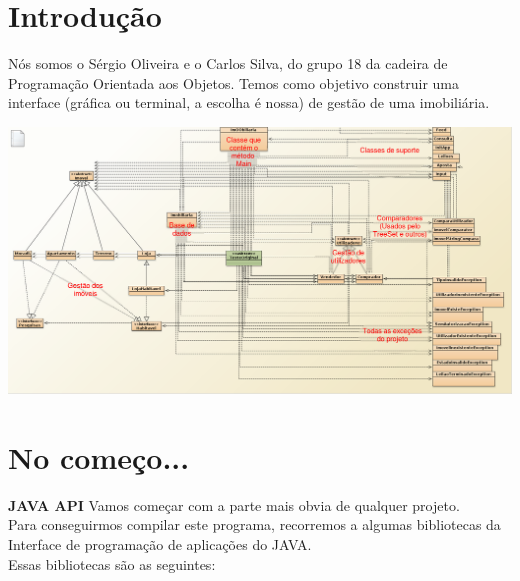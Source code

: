 \documentclass[12pt]{article}
\begin{document}

\maketitle                                            %
\pagebreak

\section{Introdução}

Nós somos o Sérgio Oliveira e o Carlos Silva, do grupo 18 da cadeira de Programação Orientada aos Objetos. Temos como objetivo construir uma interface (gráfica ou terminal, a escolha é nossa) de gestão de uma imobiliária.


\includegraphics[scale=0.25]{004.png}	
\pagebreak

\section{No começo...}

\textbf{JAVA API}
\newline
Vamos começar com a parte mais obvia de qualquer projeto.\\
Para conseguirmos compilar este programa, recorremos a algumas bibliotecas da Interface de programação de aplicações do JAVA.\\
Essas bibliotecas são as seguintes:
\newline
\end{document}
